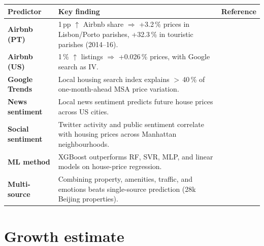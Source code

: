 \documentclass[11pt,a4paper]{article}
\begin{document}
\enlargethispage{4\baselineskip}
\begin{center}
\scriptsize
\renewcommand{\arraystretch}{1.05}
\setlength{\tabcolsep}{4pt}
\begin{tabularx}{\linewidth}{@{}>{\raggedright\arraybackslash\bfseries}p{2.1cm}X>{\raggedright\arraybackslash}p{2.9cm}@{}}
\toprule
Predictor & \textbf{Key finding} & \textbf{Reference} \\
\midrule
Airbnb (PT)      & 1\,pp $\uparrow$ Airbnb share $\Rightarrow$ +3.2\,\% prices in Lisbon/Porto parishes, +32.3\,\% in touristic parishes (2014--16). & \textcite{franco2021airbnb} \\
Airbnb (US)      & 1\,\% $\uparrow$ listings $\Rightarrow$ +0.026\,\% prices, with Google search as IV.                                            & \textcite{barron2021effect} \\
Google Trends    & Local housing search index explains $>$\,40\,\% of one-month-ahead MSA price variation.                                       & \textcite{moller2024search} \\
News sentiment   & Local news sentiment predicts future house prices across US cities.                                                          & \textcite{soo2018quantifying} \\
Social sentiment & Twitter activity and public sentiment correlate with housing prices across Manhattan neighbourhoods.                          & \textcite{tan2021spatial} \\
ML method        & XGBoost outperforms RF, SVR, MLP, and linear models on house-price regression.                                                & \textcite{sharma2024optimal} \\
Multi-source     & Combining property, amenities, traffic, and emotions beats single-source prediction (28k Beijing properties).                & \textcite{zhao2022pate} \\
\bottomrule
\end{tabularx}
\label{tab:literature}
\end{center}

\clearpage
\section{Growth estimate}\label{sec:growth}
\end{document}
